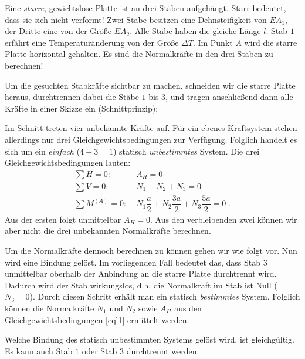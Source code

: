 \begin{example}
	Eine \emph{starre}, gewichtslose Platte ist an drei Stäben aufgehängt.
	Starr bedeutet, dass sie sich nicht verformt! Zwei Stäbe besitzen eine Dehnsteifigkeit von $EA_1$, der Dritte eine von der Größe $EA_2$.
	Alle Stäbe haben die gleiche Länge $l$. Stab $1$ erfährt eine Temperaturänderung von der Größe $\Delta T$.
	Im Punkt $A$ wird die starre Platte horizontal gehalten.
	Es sind die Normalkräfte in den drei Stäben zu berechnen!
	\begin{center}
		
	\end{center}
	
	Um die gesuchten Stabkräfte sichtbar zu machen, schneiden wir die starre Platte heraus, durchtrennen dabei die Stäbe $1$ bis $3$, und tragen anschließend dann alle Kräfte\footnotemark{} in einer Skizze ein (Schnittprinzip):
	\begin{center}
		
	\end{center}
 	Im Schnitt treten vier unbekannte Kräfte auf.
 	Für ein ebenes Kraftsystem stehen allerdings nur drei Gleichgewichtsbedingungen zur Verfügung.
 	Folglich handelt es sich um ein \emph{einfach} ($4-3=1$) statisch \emph{unbestimmtes} System.
 	Die drei Gleichgewichtsbedingungen lauten:
 	\begin{equation}
 	\begin{split}
 		\sum H=0: & \; A_H = 0 \\
 		\sum V=0: & \; N_1 + N_2 + N_3 = 0 \\
 		\sum M^{(A)} = 0: & \;  N_1\dfrac{a}{2} + N_2\dfrac{3a}{2} + N_3\dfrac{5a}{2} = 0 \;.
 	\end{split}
 	\label{eql1}
 	\end{equation}
 	Aus der ersten folgt unmittelbar $A_H=0$.
 	Aus den verbleibenden zwei können wir aber nicht die drei unbekannten Normalkräfte berechnen.
 	
 	Um die Normalkräfte dennoch berechnen zu können gehen wir wie folgt vor.
 	Nun wird eine Bindung gelöst.
 	Im vorliegenden Fall bedeutet das, dass Stab $3$ unmittelbar oberhalb der Anbindung an die starre Platte durchtrennt wird.
 	Dadurch wird der Stab wirkungslos, d.h. die Normalkraft im Stab ist Null ($N_3=0$).
 	Durch diesen Schritt erhält man ein statisch \emph{bestimmtes} System.
 	Folglich können die Normalkräfte $N_1$ und $N_2$ sowie $A_H$ aus den Gleichgewichtsbedingungen \eqref{eql1} ermittelt werden. 
 	\begin{center}
 		
 	\end{center}
 	Welche Bindung des statisch unbestimmten Systems gelöst wird, ist gleichgültig.
 	Es kann auch Stab $1$ oder Stab $3$ durchtrennt werden.
 	

\end{example}
